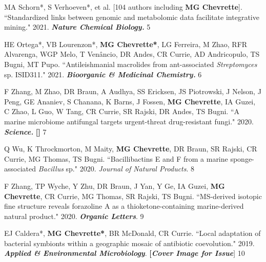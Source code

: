 \begin{cvpubs}
\cvpub
{MA Schorn*, S Verhoeven*, et al. [104 authors including \textbf{MG Chevrette}]. ``Standardized links between genomic and metabolomic data facilitate integrative mining." 2021. \textit{\textbf{Nature Chemical Biology.}} \textit{\textbf{}}}
{5}

\cvpub
{HE Ortega*, VB Lourenzon*, \textbf{MG Chevrette*}, LG Ferreira, M Zhao, RFR Alvarenga, WGP Melo, T Venâncio, DR Andes, CR Currie, AD Andricopulo, TS Bugni, MT Pupo. ``Antileishmanial macrolides from ant-associated \textit{Streptomyces} sp. ISID311." 2021. \textit{\textbf{Bioorganic \& Medicinal Chemistry.}} \textbf{\textit{}}}
{6}

\cvpub
{F Zhang, M Zhao, DR Braun, A Audhya, SS Ericksen, JS Piotrowski, J Nelson, J Peng, GE Ananiev, S Chanana, K Barns, J Fossen, \textbf{MG Chevrette}, IA Guzei, C Zhao, L Guo, W Tang, CR Currie, SR Rajski, DR Andes, TS Bugni. ``A marine microbiome antifungal targets urgent-threat drug-resistant fungi." 2020. \textit{\textbf{Science.}} \textbf{\textit{}} \linebreak
\textbf{[\textit{}]}}
{7}

\cvpub
{Q Wu, K Throckmorton, M Maity, \textbf{MG Chevrette}, DR Braun, SR Rajski, CR Currie, MG Thomas, TS Bugni. ``Bacillibactins E and F from a marine sponge-associated \textit{Bacillus} sp." 2020. \textit{Journal of Natural Products}. \textbf{\textit{}}}
{8}

\cvpub
{F Zhang, TP Wyche, Y Zhu, DR Braun, J Yan, Y Ge, IA Guzei, \textbf{MG Chevrette}, CR Currie, MG Thomas, SR Rajski, TS Bugni. ``MS-derived isotopic fine structure reveals forazoline A as a thioketone-containing marine-derived natural product." 2020. \textit{\textbf{Organic Letters}}. \textbf{\textit{}}}
{9}

\cvpub
{EJ Caldera*, \textbf{MG Chevrette*}, BR McDonald, CR Currie. ``Local adaptation of bacterial symbionts within a geographic mosaic of antibiotic coevolution." 2019. \textit{\textbf{Applied \& Environmental Microbiology}}. \textbf{\textit{}} \textbf{[\textit{Cover Image for Issue}}]}
{10}


\end{cvpubs}
